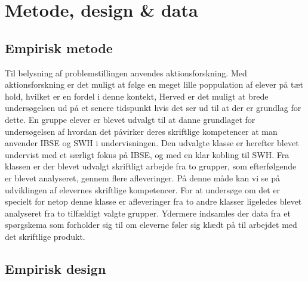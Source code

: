 \chapter{Metode, design \& data}
\label{Ch:3}


\section{Empirisk metode}
\label{sec:3.1}
Til belysning af problemstillingen anvendes aktionsforskning. Med aktionsforskning er det muligt at følge en meget lille poppulation af elever på tæt hold, hvilket er en fordel i denne kontekt, Herved er det muligt at brede undersøgelsen ud på et senere tidspunkt hvis det ser ud til at der er grundlag for dette. En gruppe elever er blevet udvalgt til at danne grundlaget for undersøgelsen af hvordan det påvirker deres skriftlige kompetencer at man anvender IBSE og SWH i undervisningen. 
Den udvalgte klasse er herefter blevet undervist med et særligt fokus på IBSE, og med en klar kobling til SWH. Fra klassen er der blevet udvalgt skriftligt arbejde fra to grupper, som efterfølgende er blevet analyseret, gennem flere afleveringer. På denne måde kan vi se på udviklingen af elevernes skriftlige kompetencer. For at undersøge om det er specielt for netop denne klasse er afleveringer fra to andre klasser ligeledes blevet analyseret fra to tilfældigt valgte grupper. 
Ydermere indsamles der data fra et spørgskema som forholder sig til om eleverne føler sig klædt på til arbejdet med det skriftlige produkt.


\section{Empirisk design}
\label{sec:3.2}

